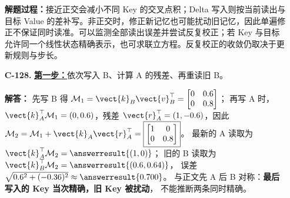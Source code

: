 \begin{enumerate}[label={},leftmargin=4.8em,itemsep=4pt]
\textbf{解题过程：}接近正交会减小不同 Key 的交叉点积；Delta 写入则按当前读出与目标 Value 的差补写。非正交时，修正新记忆也可能扰动旧记忆，因此单遍修正不保证同时读准。可以监测全部读出误差并尝试反复校正；若 Key 与目标允许同一个线性状态精确表示，也可求联立方程。反复校正的收敛仍取决于更新规则与步长。
\item[\textbf{C-128.}] \leavevmode{}\label{solution:C-128}\label{solution:delta-write-order}\hyperref[exercise:delta-write-order]{\textbf{第一步：}}依次写入 B、计算 A 的残差、再重读旧 B。\par\nobreak
\textbf{解答：} 先写 B 得
$\mathcal{M}_1=\vect{k}_B \vect{v}_B^\top=\begin{bmatrix}0&0.6\\0&0.8\end{bmatrix}$；
再写 A 时，$\vect{k}_A^\top\mathcal{M}_1=(0,0.6)$，残差
$\vect{r}_A^\top=(1,-0.6)$，因此
$\mathcal{M}_2=\mathcal{M}_1+\vect{k}_A \vect{r}_A^\top=
\boxed{\begin{bmatrix}1&0\\0&0.8\end{bmatrix}}$。
最新的 A 读取为 $\vect{k}_A^\top\mathcal{M}_2=\answerresult{(1,0)}$；
旧的 B 读取为 $\vect{k}_B^\top\mathcal{M}_2=\answerresult{(0.6,0.64)}$，
误差 $\sqrt{0.6^2+(-0.36)^2}\approx\answerresult{0.700}$。
与正文先 A 后 B 对称：\textbf{最后写入的 Key 当次精确，旧 Key 被扰动}，
不能推断两条同时精确。
\end{enumerate}
